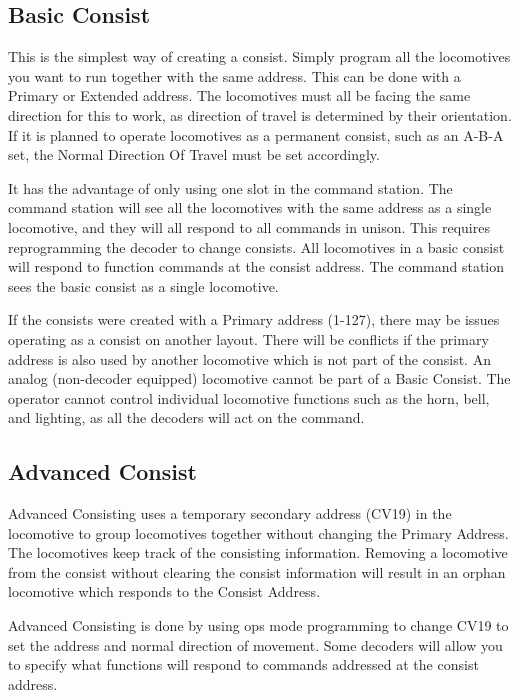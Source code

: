 \subsection{Basic Consist}

This is the simplest way of creating a consist. Simply program all the locomotives you want to run together with the same address. This can be done with a Primary or Extended address. The locomotives must all be facing the same direction for this to work, as direction of travel is determined by their orientation. If it is planned to operate locomotives as a permanent consist, such as an A-B-A set, the Normal Direction Of Travel must be set accordingly.

It has the advantage of only using one slot in the command station. The command station will see all the locomotives with the same address as a single locomotive, and they will all respond to all commands in unison. This requires reprogramming the decoder to change consists. All locomotives in a basic consist will respond to function commands at the consist address. The command station sees the basic consist as a single locomotive.

If the consists were created with a Primary address (1-127), there may be issues operating as a consist on another layout. There will be conflicts if the primary address is also used by another locomotive which is not part of the consist. An analog (non-decoder equipped) locomotive cannot be part of a Basic Consist. The operator cannot control individual locomotive functions such as the horn, bell, and lighting, as all the decoders will act on the command.

\subsection{Advanced Consist}

Advanced Consisting uses a temporary secondary address (CV19) in the locomotive to group locomotives together without changing the Primary Address. The locomotives keep track of the consisting information. Removing a locomotive from the consist without clearing the consist information will result in an orphan locomotive which responds to the \gls{Consist Address}.

Advanced Consisting is done by using ops mode programming to change CV19 to set the address and normal direction of movement. Some decoders will allow you to specify what functions will respond to commands addressed at the consist address. 

